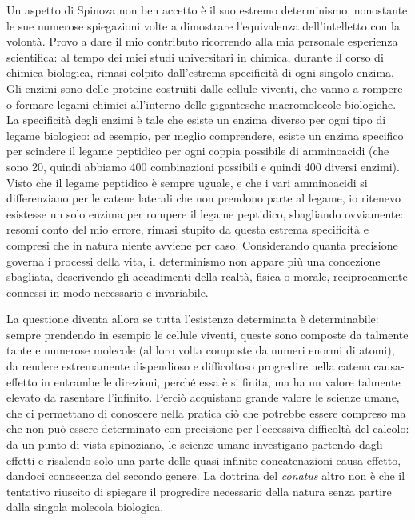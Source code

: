 Un aspetto di Spinoza non ben accetto è il suo estremo determinismo, nonostante le sue numerose spiegazioni volte a dimostrare l'equivalenza dell'intelletto con la volontà. Provo a dare il mio contributo ricorrendo alla mia personale esperienza scientifica: al tempo dei miei studi universitari in chimica, durante il corso di chimica biologica, rimasi colpito dall'estrema specificità di ogni singolo enzima. Gli enzimi sono delle proteine costruiti dalle cellule viventi, che vanno a rompere o formare legami chimici all'interno delle gigantesche macromolecole biologiche. La specificità degli enzimi è tale che esiste un enzima diverso per ogni tipo di legame biologico: ad esempio, per meglio comprendere, esiste un enzima specifico per scindere il legame peptidico per ogni coppia possibile di amminoacidi (che sono 20, quindi abbiamo 400 combinazioni possibili e quindi 400 diversi enzimi). Visto che il legame peptidico è sempre uguale, e che i vari amminoacidi si differenziano per le catene laterali che non prendono parte al legame, io ritenevo esistesse un solo enzima per rompere il legame peptidico, sbagliando ovviamente: resomi conto del mio errore, rimasi stupito da questa estrema specificità e compresi che in natura niente avviene per caso. Considerando quanta precisione  governa i processi della vita, il determinismo  non appare più una concezione sbagliata, descrivendo gli accadimenti della realtà, fisica o morale, reciprocamente connessi in modo necessario e invariabile.

La questione diventa allora se tutta l'esistenza determinata è determinabile: sempre prendendo in esempio le cellule viventi, queste sono composte da talmente tante e numerose molecole (al loro volta composte da numeri enormi di atomi), da rendere estremamente dispendioso e difficoltoso progredire nella catena causa-effetto in entrambe le direzioni, perché essa è si finita, ma ha un valore talmente elevato da rasentare l'infinito. Perciò acquistano grande valore le scienze umane, che ci permettano di conoscere nella pratica ciò che potrebbe essere compreso ma che non può essere determinato con precisione per l'eccessiva difficoltà del calcolo: da un punto di vista spinoziano, le scienze umane investigano partendo dagli effetti e risalendo solo una parte delle quasi infinite concatenazioni causa-effetto, dandoci conoscenza del secondo genere. La dottrina del \textit{conatus} altro non è che il tentativo riuscito di spiegare il progredire necessario della natura senza partire dalla singola molecola biologica.

